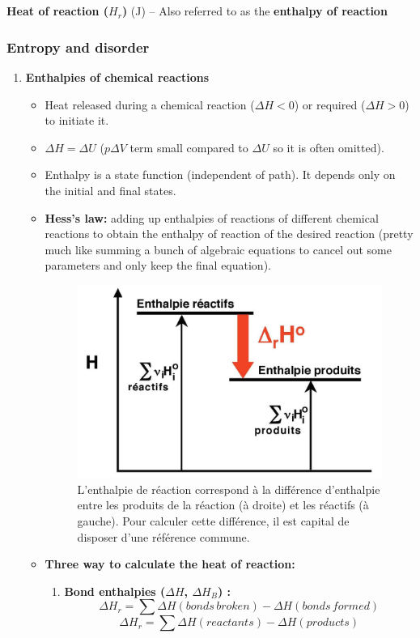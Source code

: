 \documentclass[a4paper,11pt]{article}
\begin{document}
\\ \\
\indent 
\textbf{Heat of reaction ($H_r$)} (J) -- Also referred to as the \textbf{enthalpy of reaction}  













\subsubsection{Entropy and disorder}
\begin{enumerate}
\item \textbf{Enthalpies of chemical reactions}
\noindent    
\begin{itemize}
\[\Delta H = H_f - H_i \]
\item Heat released during a chemical reaction ($\Delta H<0$) or required ($\Delta H>0$) to initiate it.
\item $\Delta H = \Delta U$ ($p \Delta V$ term small compared to $\Delta U$ so it is often omitted).
\item Enthalpy is a state function (independent of path). It depends only on the initial and final states.
\item \textbf{Hess's law:} adding up enthalpies of reactions of different chemical reactions to obtain the enthalpy of reaction of the desired reaction (pretty much like summing a bunch of algebraic equations to cancel out some parameters and only keep the final equation).
\begin{figure}[h]
\centering                \includegraphics[width=.4\linewidth]{figures/EtatRefEnthalpie.jpeg}
\caption{L'enthalpie de réaction correspond à la différence d'enthalpie entre les produits de la réaction (à droite) et les réactifs (à gauche). Pour calculer cette différence, il est capital de disposer d'une référence commune.}
\end{figure}
\item \textbf{Three way to calculate the heat of reaction:}
\begin{enumerate}
    \item \textbf{Bond enthalpies ($\Delta H$, $\Delta H_B$) :} 
    \[\Delta H_r = \sum \Delta H(bonds \,broken) - \Delta H(bonds\, formed)\]
    \[\Delta H_r = \sum \Delta H(reactants) - \Delta H(products)\]
    

\end{enumerate}
\end{itemize}
\end{enumerate}
\end{document}
